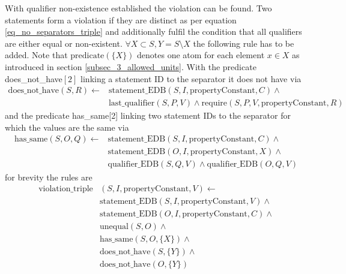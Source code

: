 \documentclass[hyperref,bachelorofscience,fleqn]{cgvpub}
\begin{document}
With qualifier non-existence established the violation can be found. Two statements form a violation if they are distinct as per equation \ref{eq_no_separators_triple} and additionally fulfil the condition that all qualifiers are either equal or non-existent. \(\forall X \subset S, Y = S \setminus X\) the following rule has to be added. Note that \(\text{predicate}(\{X\})\) denotes one atom for each element \(x \in X\) as introduced in section \ref{subsec_3_allowed_units}. With the predicate does\_not\_have\([2]\) linking a statement ID to the separator it does not have via 
\begin{equation*}
\begin{split}
\text{does\_not\_have}(S, R) \leftarrow &\text{statement\_EDB}(S, I, \text{propertyConstant}, C) \wedge{} \\
&\text{last\_qualifier}(S, P, V) \wedge \text{require}(S, P, V, \text{propertyConstant}, R)
\end{split}
\end{equation*}
and the predicate has\_same[2] linking two statement IDs to the separator for which the values are the same via
\begin{equation*}
\begin{split}
\text{has\_same}(S, O, Q) \leftarrow &\text{statement\_EDB}(S, I, \text{propertyConstant}, C) \wedge{} \\
&\text{statement\_EDB}(O, I, \text{propertyConstant}, X) \wedge{} \\
&\text{qualifier\_EDB}(S, Q, V) \wedge \text{qualifier\_EDB}(O, Q, V)
\end{split}
\end{equation*}
 for brevity the rules are
\begin{equation*}
\begin{split}
\text{violation\_triple}&(S, I, \text{propertyConstant}, V) \leftarrow \\
&\text{statement\_EDB}(S, I, \text{propertyConstant}, V) \wedge{} \\
&\text{statement\_EDB}(O, I, \text{propertyConstant}, C) \wedge{} \\
&\text{unequal}(S, O) \wedge{} \\
&\text{has\_same}(S, O, \{X\}) \wedge{} \\
&\text{does\_not\_have}(S, \{Y\}) \wedge{} \\
&\text{does\_not\_have}(O, \{Y\})
\end{split}
\end{equation*}
\end{document}
